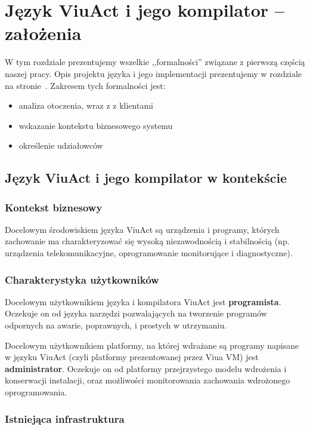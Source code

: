 \chapter{Język ViuAct i jego kompilator -- założenia}
\label{viuact_zal}

W tym rozdziale prezentujemy wszelkie ,,formalności'' związane z pierwszą częścią naszej pracy.
Opis projektu języka i jego implementacji prezentujemy w rozdziale  na
stronie~\pageref{viuact_impl}. Zakresem tych formalności jest:

\begin{itemize}
    \item analiza otoczenia, wraz z z klientami
    \item wskazanie kontekstu biznesowego systemu
    \item określenie udziałowców
\end{itemize}

\section{Język ViuAct i jego kompilator w kontekście}

\subsection{Kontekst biznesowy}

Docelowym środowiskiem języka ViuAct są urządzenia i programy, których zachowanie ma charakteryzować się wysoką
niezawodnością i stabilnością (np. urządzenia telekomunikacyjne, oprogramowanie monitorujące i diagnostyczne).

\subsection{Charakterystyka użytkowników}

Docelowym użytkownikiem języka i kompilatora ViuAct jest \textbf{programista}.
Oczekuje on od języka narzędzi pozwalających na tworzenie programów odpornych na awarie, poprawnych, i
prostych w utrzymaniu.

Docelowym użytkownikiem platformy, na której wdrażane są programy napisane w języku ViuAct (czyli platformy
prezentowanej przez Viua VM) jest \textbf{administrator}. Oczekuje on od platformy przejrzystego modelu
wdrożenia i konserwacji instalacji, oraz możliwości monitorowania zachowania wdrożonego oprogramowania.

\subsection{Istniejąca infrastruktura}

